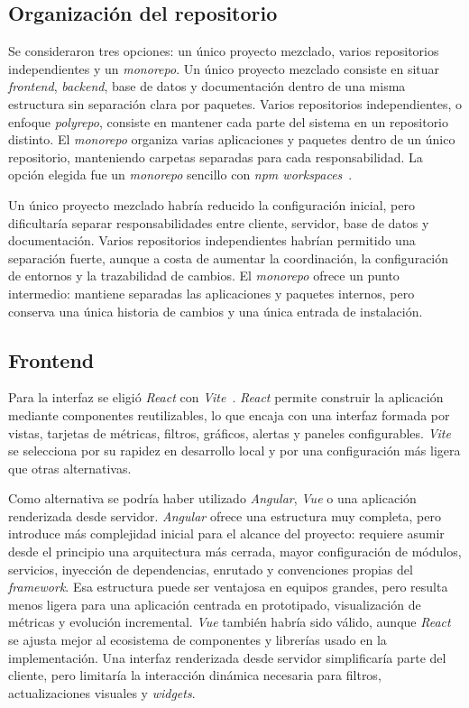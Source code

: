 \subsection{Organización del repositorio}

Se consideraron tres opciones: un único proyecto mezclado, varios repositorios independientes y un \textit{monorepo}. Un único proyecto mezclado consiste en situar \textit{frontend}, \textit{backend}, base de datos y documentación dentro de una misma estructura sin separación clara por paquetes. Varios repositorios independientes, o enfoque \textit{polyrepo}, consiste en mantener cada parte del sistema en un repositorio distinto. El \textit{monorepo} organiza varias aplicaciones y paquetes dentro de un único repositorio, manteniendo carpetas separadas para cada responsabilidad. La opción elegida fue un \textit{monorepo} sencillo con \textit{npm workspaces}~\cite{NpmWorkspaces}.

Un único proyecto mezclado habría reducido la configuración inicial, pero dificultaría separar responsabilidades entre cliente, servidor, base de datos y documentación. Varios repositorios independientes habrían permitido una separación fuerte, aunque a costa de aumentar la coordinación, la configuración de entornos y la trazabilidad de cambios. El \textit{monorepo} ofrece un punto intermedio: mantiene separadas las aplicaciones y paquetes internos, pero conserva una única historia de cambios y una única entrada de instalación.

\subsection{Frontend}

Para la interfaz se eligió \textit{React} con \textit{Vite}~\cite{ReactDocs,ViteDocs}. \textit{React} permite construir la aplicación mediante componentes reutilizables, lo que encaja con una interfaz formada por vistas, tarjetas de métricas, filtros, gráficos, alertas y paneles configurables. \textit{Vite} se selecciona por su rapidez en desarrollo local y por una configuración más ligera que otras alternativas.

Como alternativa se podría haber utilizado \textit{Angular}, \textit{Vue} o una aplicación renderizada desde servidor. \textit{Angular} ofrece una estructura muy completa, pero introduce más complejidad inicial para el alcance del proyecto: requiere asumir desde el principio una arquitectura más cerrada, mayor configuración de módulos, servicios, inyección de dependencias, enrutado y convenciones propias del \textit{framework}. Esa estructura puede ser ventajosa en equipos grandes, pero resulta menos ligera para una aplicación centrada en prototipado, visualización de métricas y evolución incremental. \textit{Vue} también habría sido válido, aunque \textit{React} se ajusta mejor al ecosistema de componentes y librerías usado en la implementación. Una interfaz renderizada desde servidor simplificaría parte del cliente, pero limitaría la interacción dinámica necesaria para filtros, actualizaciones visuales y \textit{widgets}.

